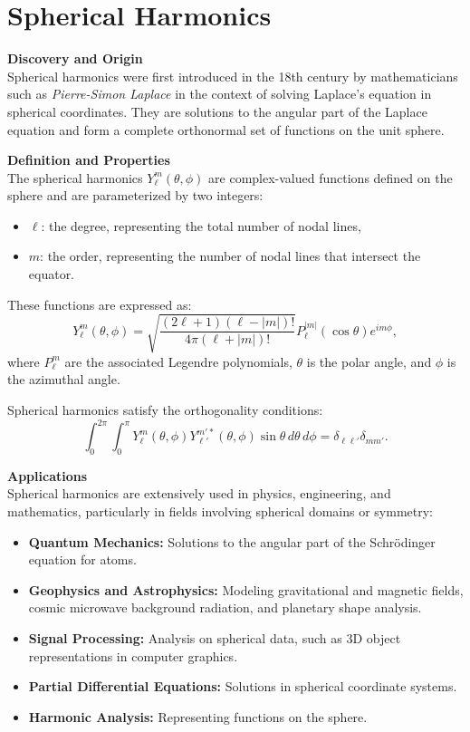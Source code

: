 % 

\section{Spherical Harmonics}

\textbf{Discovery and Origin} \\
Spherical harmonics were first introduced in the 18th century by mathematicians such as \textit{Pierre-Simon Laplace} in the context of solving Laplace's equation in spherical coordinates. They are solutions to the angular part of the Laplace equation and form a complete orthonormal set of functions on the unit sphere.

\textbf{Definition and Properties} \\
The spherical harmonics \( Y_\ell^m(\theta, \phi) \) are complex-valued functions defined on the sphere and are parameterized by two integers: 
\begin{itemize}
    \item \( \ell \): the degree, representing the total number of nodal lines,
    \item \( m \): the order, representing the number of nodal lines that intersect the equator.
\end{itemize}
These functions are expressed as:
\[
Y_\ell^m(\theta, \phi) = \sqrt{\frac{(2\ell + 1)(\ell - |m|)!}{4\pi (\ell + |m|)!}} P_\ell^{|m|}(\cos\theta) e^{im\phi},
\]
where \( P_\ell^m \) are the associated Legendre polynomials, \( \theta \) is the polar angle, and \( \phi \) is the azimuthal angle.

Spherical harmonics satisfy the orthogonality conditions:
\[
\int_{0}^{2\pi} \int_{0}^{\pi} Y_\ell^m(\theta, \phi) Y_{\ell'}^{m'*}(\theta, \phi) \sin\theta \, d\theta \, d\phi = \delta_{\ell\ell'} \delta_{mm'}.
\]

\textbf{Applications} \\
Spherical harmonics are extensively used in physics, engineering, and mathematics, particularly in fields involving spherical domains or symmetry:
\begin{itemize}
    \item \textbf{Quantum Mechanics:} Solutions to the angular part of the Schrödinger equation for atoms.
    \item \textbf{Geophysics and Astrophysics:} Modeling gravitational and magnetic fields, cosmic microwave background radiation, and planetary shape analysis.
    \item \textbf{Signal Processing:} Analysis on spherical data, such as 3D object representations in computer graphics.
    \item \textbf{Partial Differential Equations:} Solutions in spherical coordinate systems.
    \item \textbf{Harmonic Analysis:} Representing functions on the sphere.
\end{itemize}

